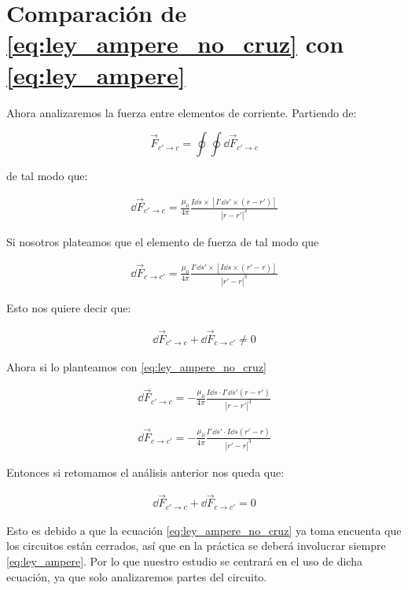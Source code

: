 \documentclass[11pt]{report}
\theoremstyle{plain}
\theoremstyle{definition}
\begin{document}
\section{Comparación de \ref{eq:ley_ampere_no_cruz} con \ref{eq:ley_ampere}}

Ahora analizaremos la fuerza entre elementos de corriente. Partiendo de:

\begin{equation}
	\vec{F}_{c'\rightarrow c} = \oint \oint \dd{\vec{F}_{c'\rightarrow c}}
\end{equation}


de tal modo que: 

\begin{align*}
	\dd{\vec{F}_{c'\rightarrow c}} = \frac{\mu_0}{4\pi} \frac{I\dd{s}\times[I'\dd{s'}\times(r-r')]}{|r-r'|^3}
\end{align*}


Si nosotros plateamos que el elemento de fuerza de tal modo que

\begin{align*}
	\dd{\vec{F}_{c\rightarrow c'}} = \frac{\mu_0}{4\pi} \frac{I'\dd{s'}\times[I\dd{s}\times(r'-r)]}{|r'-r|^3}
\end{align*}

Esto nos quiere decir que:

\begin{align*}
	\dd{\vec{F}_{c'\rightarrow c}} + \dd{\vec{F}_{c\rightarrow c'}} \neq 0
\end{align*}

Ahora si lo planteamos con \ref{eq:ley_ampere_no_cruz}

\begin{align*}
	\dd{\vec{F}_{c'\rightarrow c}} = - \frac{\mu_0}{4\pi}\frac{I\dd{s}\cdot I'\dd{s'}(r-r')}{|r-r'|^3}
\end{align*}


\begin{align*}
	\dd{\vec{F}_{c\rightarrow c'}} = - \frac{\mu_0}{4\pi}\frac{I'\dd{s'}\cdot I\dd{s}(r'-r)}{|r'-r|^3}
\end{align*}

Entonces si retomamos el análisis anterior nos queda que: 

\begin{align*}
	\dd{\vec{F}_{c'\rightarrow c}} + \dd{\vec{F}_{c\rightarrow c'}} = 0
\end{align*}

Esto es debido a que la ecuación \ref{eq:ley_ampere_no_cruz} ya toma encuenta que los circuitos están cerrados, así que en la práctica se deberá involucrar siempre \ref{eq:ley_ampere}. Por lo que nuestro estudio se centrará en el uso de dicha ecuación, ya que solo analizaremos partes del circuito.\\
\end{document}
